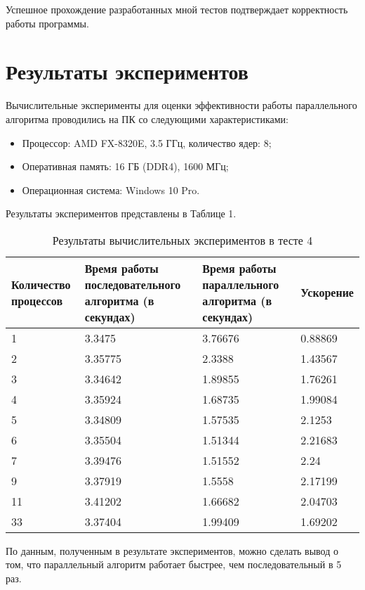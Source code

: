 \documentclass{report}
\begin{document}
\par Успешное прохождение разработанных мной тестов подтверждает корректность работы программы.
\newpage

\section*{Результаты экспериментов}
Вычислительные эксперименты для оценки эффективности работы параллельного алгоритма проводились на ПК со следующими характеристиками:
\begin{itemize}
\item Процессор: AMD FX-8320E, 3.5 ГГц, количество ядер: 8;
\item Оперативная память: 16 ГБ (DDR4), 1600  МГц;
\item Операционная система: Windows 10 Pro.
\end{itemize}

\par Результаты экспериментов представлены в Таблице 1.

\begin{table}[!h]
\caption{Результаты вычислительных экспериментов в тесте 4}
\centering
\begin{tabular}{| p{2cm} | p{3cm} | p{4cm} | p{2cm} |}
\hline
Количество процессов & Время работы последовательного алгоритма (в секундах) & Время работы параллельного алгоритма (в секундах) & Ускорение  \\[5pt]
\hline
1        & 3.3475        & 3.76676     & 0.88869       \\
2        & 3.35775        & 2.3388     & 1.43567       \\
3        & 3.34642        & 1.89855     & 1.76261       \\
4        & 3.35924        & 1.68735     & 1.99084       \\
5        & 3.34809        & 1.57535     & 2.1253       \\
6        & 3.35504        & 1.51344     & 2.21683       \\
7        & 3.39476        & 1.51552     & 2.24       \\
9        & 3.37919        & 1.5558     & 2.17199	    \\
11        & 3.41202        & 1.66682     & 2.04703	  \\
33        & 3.37404        & 1.99409     & 1.69202	  \\
\hline
\end{tabular}
\end{table}
По данным, полученным в результате экспериментов, можно сделать вывод о том,
что параллельный алгоритм работает быстрее, чем последовательный в 5 раз.
\end{document}
